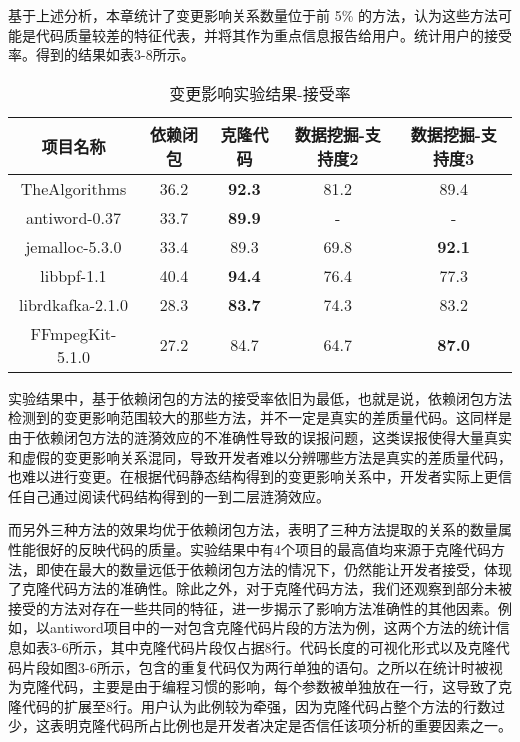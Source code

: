 基于上述分析，本章统计了变更影响关系数量位于前 5\% 的方法，认为这些方法可能是代码质量较差的特征代表，并将其作为重点信息报告给用户。统计用户的接受率。得到的结果如表3-8所示。

\begin{table}[htbp]
\caption{变更影响实验结果-接受率}
\vspace{0.5em}\centering\wuhao
\begin{tabular}{ccccc}
\toprule
项目名称 & 依赖闭包 & 克隆代码 & 数据挖掘-支持度2 & 数据挖掘-支持度3 \\
\midrule
TheAlgorithms & 36.2 & \textbf{92.3} & 81.2 & 89.4\\
antiword-0.37 & 33.7 & \textbf{89.9} & - & -\\
jemalloc-5.3.0 & 33.4 & 89.3 & 69.8 & \textbf{92.1}\\
libbpf-1.1 & 40.4 & \textbf{94.4} & 76.4 & 77.3\\
librdkafka-2.1.0 & 28.3 & \textbf{83.7} & 74.3 & 83.2\\
FFmpegKit-5.1.0 & 27.2 & 84.7 & 64.7 & \textbf{87.0}\\

\bottomrule
\end{tabular}
\end{table}

实验结果中，基于依赖闭包的方法的接受率依旧为最低，也就是说，依赖闭包方法检测到的变更影响范围较大的那些方法，并不一定是真实的差质量代码。这同样是由于依赖闭包方法的涟漪效应的不准确性导致的误报问题，这类误报使得大量真实和虚假的变更影响关系混同，导致开发者难以分辨哪些方法是真实的差质量代码，也难以进行变更。在根据代码静态结构得到的变更影响关系中，开发者实际上更信任自己通过阅读代码结构得到的一到二层涟漪效应。

而另外三种方法的效果均优于依赖闭包方法，表明了三种方法提取的关系的数量属性能很好的反映代码的质量。实验结果中有4个项目的最高值均来源于克隆代码方法，即使在最大的数量远低于依赖闭包方法的情况下，仍然能让开发者接受，体现了克隆代码方法的准确性。除此之外，对于克隆代码方法，我们还观察到部分未被接受的方法对存在一些共同的特征，进一步揭示了影响方法准确性的其他因素。例如，以antiword项目中的一对包含克隆代码片段的方法为例，这两个方法的统计信息如表3-6所示，其中克隆代码片段仅占据8行。代码长度的可视化形式以及克隆代码片段如图3-6所示，包含的重复代码仅为两行单独的语句。之所以在统计时被视为克隆代码，主要是由于编程习惯的影响，每个参数被单独放在一行，这导致了克隆代码的扩展至8行。用户认为此例较为牵强，因为克隆代码占整个方法的行数过少，这表明克隆代码所占比例也是开发者决定是否信任该项分析的重要因素之一。

